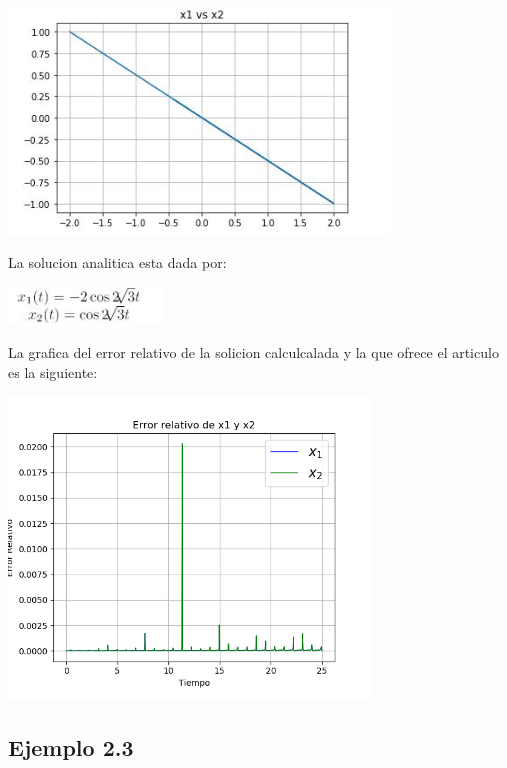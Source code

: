 \documentclass{article}
\begin{document}
\begin{center}
\includegraphics[height=6cm]{resortes2_2_2.png}
\end{center}

La solucion analitica esta dada por:

\begin{center}
\includegraphics[height=1cm]{ec11.png}
\end{center}


La grafica del error relativo de la solicion calculcalada y la que ofrece el articulo es la siguiente:

\begin{center}
\includegraphics[height=8cm]{ErrorRelativo2_2.png}
\end{center}


\subsection{Ejemplo 2.3}
\end{document}
